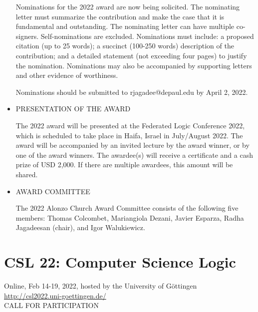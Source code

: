\documentclass[prodmode,acmtecs]{acmsmall} %
\begin{document}
\begin{itemize}
  Nominations for the 2022 award are now being solicited. The nominating letter must summarize the contribution and make the case that it is fundamental and outstanding. The nominating letter can have multiple co-signers. Self-nominations are excluded. Nominations must include: a proposed citation (up to 25 words); a succinct (100-250 words) description of the contribution; and a detailed statement (not exceeding four pages) to justify the nomination. Nominations may also be accompanied by supporting letters and other evidence of worthiness. 
 
  Nominations should be submitted to rjagadee@depaul.edu by April 2, 2022. 
 
\item  PRESENTATION OF THE AWARD 
 
  The 2022 award will be presented at the Federated Logic Conference 2022, which is scheduled to take place in Haifa, Israel in July/August 2022. The award will be accompanied by an invited lecture by the award winner, or by one of the award winners. The awardee(s) will receive a certificate and a cash prize of USD 2,000. If there are multiple awardees, this amount will be shared. 
 
\item  AWARD COMMITTEE 
 
  The 2022 Alonzo Church Award Committee consists of the following five members: Thomas Colcombet, Mariangiola Dezani, Javier Esparza, Radha Jagadeesan (chair), and Igor Walukiewicz. 
 
\end{itemize}\section{CSL 22: Computer Science Logic }\label{CSL22}  Online, Feb 14-19, 2022, hosted by the University of Göttingen\\ 
  \href{http://csl2022.uni-goettingen.de/}{http://csl2022.uni-goettingen.de/}\\ 
CALL FOR PARTICIPATION 
\end{document}
